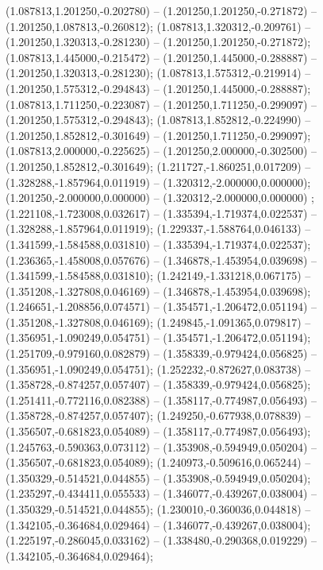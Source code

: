  (1.087813,1.201250,-0.202780) -- (1.201250,1.201250,-0.271872) -- (1.201250,1.087813,-0.260812);
 (1.087813,1.320312,-0.209761) -- (1.201250,1.320313,-0.281230) -- (1.201250,1.201250,-0.271872);
 (1.087813,1.445000,-0.215472) -- (1.201250,1.445000,-0.288887) -- (1.201250,1.320313,-0.281230);
 (1.087813,1.575312,-0.219914) -- (1.201250,1.575312,-0.294843) -- (1.201250,1.445000,-0.288887);
 (1.087813,1.711250,-0.223087) -- (1.201250,1.711250,-0.299097) -- (1.201250,1.575312,-0.294843);
 (1.087813,1.852812,-0.224990) -- (1.201250,1.852812,-0.301649) -- (1.201250,1.711250,-0.299097);
 (1.087813,2.000000,-0.225625) -- (1.201250,2.000000,-0.302500) -- (1.201250,1.852812,-0.301649);
 (1.211727,-1.860251,0.017209) -- (1.328288,-1.857964,0.011919) -- (1.320312,-2.000000,0.000000);
 (1.201250,-2.000000,0.000000) -- (1.320312,-2.000000,0.000000) ;
 (1.221108,-1.723008,0.032617) -- (1.335394,-1.719374,0.022537) -- (1.328288,-1.857964,0.011919);
 (1.229337,-1.588764,0.046133) -- (1.341599,-1.584588,0.031810) -- (1.335394,-1.719374,0.022537);
 (1.236365,-1.458008,0.057676) -- (1.346878,-1.453954,0.039698) -- (1.341599,-1.584588,0.031810);
 (1.242149,-1.331218,0.067175) -- (1.351208,-1.327808,0.046169) -- (1.346878,-1.453954,0.039698);
 (1.246651,-1.208856,0.074571) -- (1.354571,-1.206472,0.051194) -- (1.351208,-1.327808,0.046169);
 (1.249845,-1.091365,0.079817) -- (1.356951,-1.090249,0.054751) -- (1.354571,-1.206472,0.051194);
 (1.251709,-0.979160,0.082879) -- (1.358339,-0.979424,0.056825) -- (1.356951,-1.090249,0.054751);
 (1.252232,-0.872627,0.083738) -- (1.358728,-0.874257,0.057407) -- (1.358339,-0.979424,0.056825);
 (1.251411,-0.772116,0.082388) -- (1.358117,-0.774987,0.056493) -- (1.358728,-0.874257,0.057407);
 (1.249250,-0.677938,0.078839) -- (1.356507,-0.681823,0.054089) -- (1.358117,-0.774987,0.056493);
 (1.245763,-0.590363,0.073112) -- (1.353908,-0.594949,0.050204) -- (1.356507,-0.681823,0.054089);
 (1.240973,-0.509616,0.065244) -- (1.350329,-0.514521,0.044855) -- (1.353908,-0.594949,0.050204);
 (1.235297,-0.434411,0.055533) -- (1.346077,-0.439267,0.038004) -- (1.350329,-0.514521,0.044855);
 (1.230010,-0.360036,0.044818) -- (1.342105,-0.364684,0.029464) -- (1.346077,-0.439267,0.038004);
 (1.225197,-0.286045,0.033162) -- (1.338480,-0.290368,0.019229) -- (1.342105,-0.364684,0.029464);

